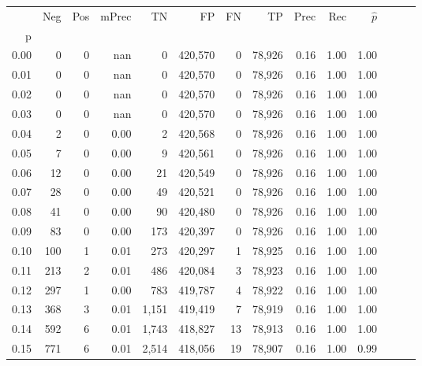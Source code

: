 \begin{tabular}{rrrrrrrrrrrrrr}
\toprule
{} &     Neg &    Pos & mPrec &       TN &       FP &      FN &      TP &  Prec &   Rec & $\hat{p}$ \\
p    &         &        &       &          &          &         &         &       &       &           \\
\midrule
0.00 &       0 &      0 &   nan &        0 &  420,570 &       0 &  78,926 &  0.16 &  1.00 &      1.00 \\
0.01 &       0 &      0 &   nan &        0 &  420,570 &       0 &  78,926 &  0.16 &  1.00 &      1.00 \\
0.02 &       0 &      0 &   nan &        0 &  420,570 &       0 &  78,926 &  0.16 &  1.00 &      1.00 \\
0.03 &       0 &      0 &   nan &        0 &  420,570 &       0 &  78,926 &  0.16 &  1.00 &      1.00 \\
0.04 &       2 &      0 &  0.00 &        2 &  420,568 &       0 &  78,926 &  0.16 &  1.00 &      1.00 \\
0.05 &       7 &      0 &  0.00 &        9 &  420,561 &       0 &  78,926 &  0.16 &  1.00 &      1.00 \\
0.06 &      12 &      0 &  0.00 &       21 &  420,549 &       0 &  78,926 &  0.16 &  1.00 &      1.00 \\
0.07 &      28 &      0 &  0.00 &       49 &  420,521 &       0 &  78,926 &  0.16 &  1.00 &      1.00 \\
0.08 &      41 &      0 &  0.00 &       90 &  420,480 &       0 &  78,926 &  0.16 &  1.00 &      1.00 \\
0.09 &      83 &      0 &  0.00 &      173 &  420,397 &       0 &  78,926 &  0.16 &  1.00 &      1.00 \\
0.10 &     100 &      1 &  0.01 &      273 &  420,297 &       1 &  78,925 &  0.16 &  1.00 &      1.00 \\
0.11 &     213 &      2 &  0.01 &      486 &  420,084 &       3 &  78,923 &  0.16 &  1.00 &      1.00 \\
0.12 &     297 &      1 &  0.00 &      783 &  419,787 &       4 &  78,922 &  0.16 &  1.00 &      1.00 \\
0.13 &     368 &      3 &  0.01 &    1,151 &  419,419 &       7 &  78,919 &  0.16 &  1.00 &      1.00 \\
0.14 &     592 &      6 &  0.01 &    1,743 &  418,827 &      13 &  78,913 &  0.16 &  1.00 &      1.00 \\
0.15 &     771 &      6 &  0.01 &    2,514 &  418,056 &      19 &  78,907 &  0.16 &  1.00 &      0.99 \\

\end{tabular}
